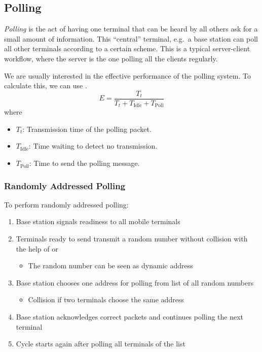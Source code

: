 \subsection{Polling}\label{subsec:Polling}
\begin{definition}[Polling]\label{def:Polling}
  \emph{Polling} is the act of having one terminal that can be heard by all others ask for a small amount of information.
  This ``central'' terminal, e.g.\ a base station can poll all other terminals according to a certain scheme.
  This is a typical server-client workflow, where the server is the one polling all the clients regularly.
\end{definition}

We are usually interested in the effective performance of the polling system.
To calculate this, we can use .
\begin{equation}\label{eq:Polling_Effective_Performance}
  E = \frac{T_{t}}{T_{t} + T_{\mathrm{Idle}} + T_{\mathrm{Poll}}}
\end{equation}
where
\begin{itemize}[noitemsep]
\item $T_{t}$: Transmission time of the polling packet.
\item $T_{\mathrm{Idle}}$: Time waiting to detect no transmission.
\item $T_{\mathrm{Poll}}$: Time to send the polling message.
\end{itemize}

\subsubsection{Randomly Addressed Polling}\label{subsubsec:Randomly_Addressed_Polling}
To perform randomly addressed polling:
\begin{enumerate}[noitemsep]
\item Base station signals readiness to all mobile terminals
\item Terminals ready to send transmit a random number without collision with the help of  or 
  \begin{itemize}[noitemsep]
  \item The random number can be seen as dynamic address
  \end{itemize}

\item Base station chooses one address for polling from list of all random numbers
  \begin{itemize}[noitemsep]
  \item Collision if two terminals choose the same address
  \end{itemize}

\item Base station acknowledges correct packets and continues polling the next terminal
\item Cycle starts again after polling all terminals of the list
\end{enumerate}

